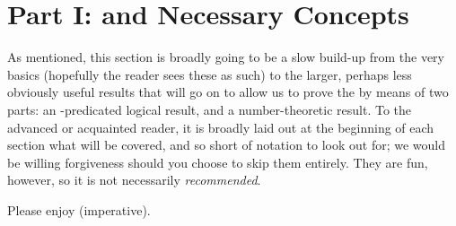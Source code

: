 % 
%
%

\section{Part I: \Omy and Necessary Concepts}

\noindent As mentioned, this section is broadly going to be a slow build-up from the very basics (hopefully the reader sees these as such) to the larger, perhaps less obviously useful results that will go on to allow us to prove the \pwt by means of two parts: an \omy-predicated logical result, and a number-theoretic result. To the advanced or acquainted reader, it is broadly laid out at the beginning of each section what will be covered, and so short of notation to look out for; we would be willing forgiveness should you choose to skip them entirely. They are fun, however, so it is not necessarily \emph{recommended}.

Please enjoy (imperative).
